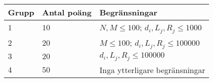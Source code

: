 \noindent
\begin{tabular}{| l | l | p{12cm} |}
  \hline
  \textbf{Grupp} & \textbf{Antal poäng} & \textbf{Begränsningar} \\ \hline
  $1$    & $10$       & $N, M \le 100$; $d_i, L_j, R_j \le 1000$ \\ \hline
  $2$    & $20$       & $M \le 100$; $d_i, L_j, R_j \le 100000$ \\ \hline
  $3$    & $20$       & $d_i, L_j, R_j \le 100000$ \\ \hline
  $4$    & $50$       & Inga ytterligare begränsningar \\ \hline
\end{tabular}

